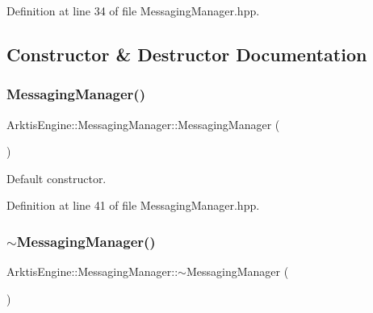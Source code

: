 \begin{DoxyVerb}\end{DoxyVerb}
 

Definition at line 34 of file Messaging\+Manager.\+hpp.



\subsection{Constructor \& Destructor Documentation}
\mbox{\label{class_arktis_engine_1_1_messaging_manager_a2e4ad223ee19fffcab9dd3b6bc55e35a}} 
\subsubsection{\texorpdfstring{MessagingManager()}{MessagingManager()}}
{\footnotesize\ttfamily Arktis\+Engine\+::\+Messaging\+Manager\+::\+Messaging\+Manager (\begin{DoxyParamCaption}{ }\end{DoxyParamCaption})\hspace{0.3cm}{\ttfamily [inline]}}



Default constructor. 

\begin{DoxyVerb}\end{DoxyVerb}
 

Definition at line 41 of file Messaging\+Manager.\+hpp.


\begin{DoxyCode}{0}

\end{DoxyCode}
\mbox{\label{class_arktis_engine_1_1_messaging_manager_ae5256f6a249582a27688925e34ce595d}} 
\subsubsection{\texorpdfstring{$\sim$MessagingManager()}{~MessagingManager()}}
{\footnotesize\ttfamily Arktis\+Engine\+::\+Messaging\+Manager\+::$\sim$\+Messaging\+Manager (\begin{DoxyParamCaption}{ }\end{DoxyParamCaption})\hspace{0.3cm}{\ttfamily [inline]}}




